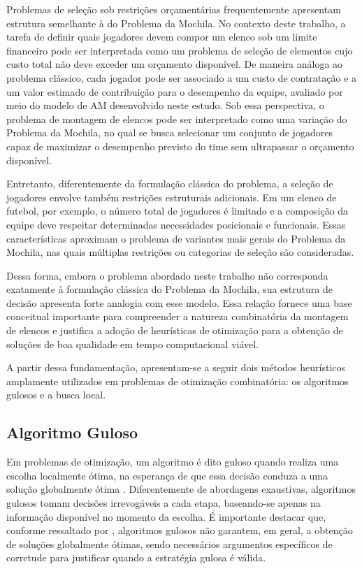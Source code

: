 Problemas de seleção sob restrições orçamentárias frequentemente apresentam estrutura semelhante à do Problema da Mochila. No contexto deste
trabalho, a tarefa de definir quais jogadores devem compor um elenco sob um limite financeiro pode ser interpretada como um problema de seleção
de elementos cujo custo total não deve exceder um orçamento disponível. De maneira análoga ao problema clássico, cada jogador pode ser associado
a um custo de contratação e a um valor estimado de contribuição para o desempenho da equipe, avaliado por meio do modelo de AM
desenvolvido neste estudo. Sob essa perspectiva, o problema de montagem de elencos pode ser interpretado como uma variação do Problema da Mochila, 
no qual se busca selecionar um conjunto de jogadores capaz de maximizar o desempenho previsto do time sem ultrapassar o orçamento disponível.

Entretanto, diferentemente da formulação clássica do problema, a seleção de jogadores envolve também restrições estruturais adicionais. Em um elenco 
de futebol, por exemplo, o número total de jogadores é limitado e a composição da equipe deve respeitar determinadas necessidades posicionais e funcionais. 
Essas características aproximam o problema de variantes mais gerais do Problema da Mochila, nas quais múltiplas restrições ou categorias de seleção são consideradas.

Dessa forma, embora o problema abordado neste trabalho não corresponda exatamente à formulação clássica do Problema da Mochila, sua estrutura 
de decisão apresenta forte analogia com esse modelo. Essa relação fornece uma base conceitual importante para compreender a natureza combinatória da montagem de 
elencos e justifica a adoção de heurísticas de otimização para a obtenção de soluções de boa qualidade em tempo computacional viável.

A partir dessa fundamentação, apresentam-se a seguir dois métodos heurísticos amplamente utilizados em problemas de otimização combinatória: 
os algoritmos gulosos e a busca local.

\subsection{Algoritmo Guloso}

Em problemas de otimização, um algoritmo é dito guloso quando realiza uma escolha localmente ótima, na esperança de que essa decisão conduza a 
uma solução globalmente ótima \cite{Cormen2009}. Diferentemente de abordagens exaustivas, algoritmos gulosos tomam decisões irrevogáveis a cada etapa, baseando-se
apenas na informação disponível no momento da escolha. É importante destacar que, conforme ressaltado por \cite{Cormen2009}, 
algoritmos gulosos não garantem, em geral, a obtenção de soluções globalmente ótimas, sendo necessários argumentos específicos de corretude para justificar
quando a estratégia gulosa é válida.

